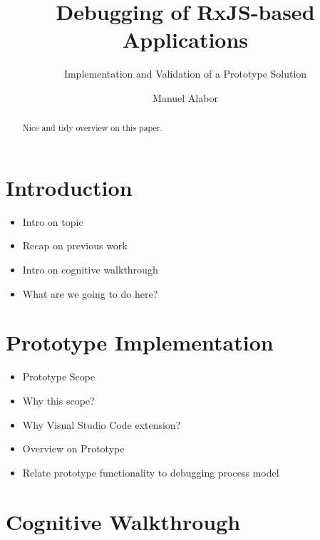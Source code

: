\documentclass[sigplan,screen,nonacm,review]{acmart}
\title{Debugging of RxJS-based Applications}
\subtitle{Implementation and Validation of a Prototype Solution}
\author{Manuel Alabor}
\affiliation{
	\institution{Eastern Switzerland University of Applied Sciences}
	\city{Rapperswil}
	\country{Switzerland}
}
\begin{document}
\begin{abstract}
	Nice and tidy overview on this paper.
\end{abstract}




\maketitle

\section{Introduction}
\label{sec:intro}

\begin{itemize}
	\item Intro on topic
	\item Recap on previous work
	\item Intro on cognitive walkthrough \cite{Wharton_Rieman_Clayton_Polson_1994}
	\item What are we going to do here?
\end{itemize}

\section{Prototype Implementation}
\label{sec:prototype}

\begin{itemize}
	\item Prototype Scope
	\item Why this scope?
	\item Why Visual Studio Code extension?
	\item Overview on Prototype
	\item Relate prototype functionality to debugging process model \cite{Layman_Diep_Nagappan_Singer_Deline_Venolia_2013}
\end{itemize}

\section{Cognitive Walkthrough}
\label{sec:cogitive-walkthrough}
\end{document}
